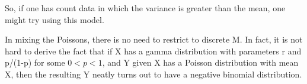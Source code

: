 \documentclass[11pt]{article}
\begin{document}
So, if one has count data in which the variance is greater than the
mean, one might try using this model.

In mixing the Poissons, there is no need to restrict to discrete M.  In
fact, it is not hard to derive the fact that if X has a gamma
distribution with parameters r and p/(1-p) for some $0 < p < 1$, and Y
given X has a Poisson distribution with mean X, then the resulting Y
neatly turns out to have a negative binomial distribution.


% 
% 
% 
% 
% 

% 
% 
\end{document}

